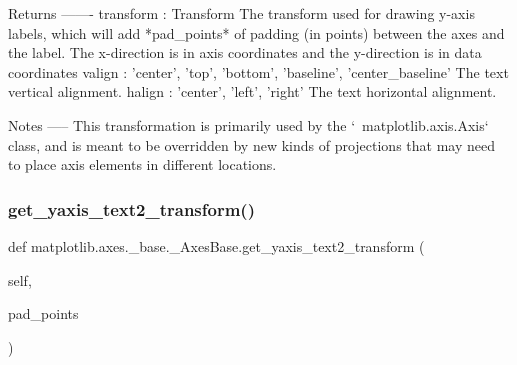 \begin{DoxyVerb}Returns
-------
transform : Transform
    The transform used for drawing y-axis labels, which will add
    *pad_points* of padding (in points) between the axes and the label.
    The x-direction is in axis coordinates and the y-direction is in
    data coordinates
valign : {'center', 'top', 'bottom', 'baseline', 'center_baseline'}
    The text vertical alignment.
halign : {'center', 'left', 'right'}
    The text horizontal alignment.

Notes
-----
This transformation is primarily used by the `~matplotlib.axis.Axis`
class, and is meant to be overridden by new kinds of projections that
may need to place axis elements in different locations.
\end{DoxyVerb}
 \mbox{\label{classmatplotlib_1_1axes_1_1__base_1_1__AxesBase_a5cebd925e31a1a219128746758a2dce7}} 
\subsubsection{\texorpdfstring{get\+\_\+yaxis\+\_\+text2\+\_\+transform()}{get\_yaxis\_text2\_transform()}}
{\footnotesize\ttfamily def matplotlib.\+axes.\+\_\+base.\+\_\+\+Axes\+Base.\+get\+\_\+yaxis\+\_\+text2\+\_\+transform (\begin{DoxyParamCaption}\item[{}]{self,  }\item[{}]{pad\+\_\+points }\end{DoxyParamCaption})}

